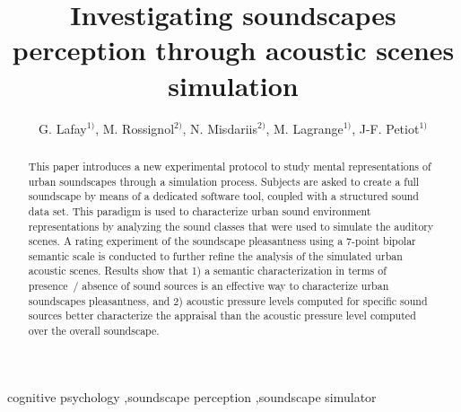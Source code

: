 \documentclass[12pt]{elsarticle}
\begin{document}
\begin{frontmatter}


    \author{G. Lafay$^{1)}$, M. Rossignol$^{2)}$, N. Misdariis$^{2)}$, M. Lagrange$^{1)}$, J-F. Petiot$^{1)}$}

    \address{$^{1)}$ Laboratoire des Sciences du Numérique de Nantes-CNRS-\'Ecole Centrale de Nantes, Nantes, France.\\
    \hspace*{8pt}mathieu.lagrange@cnrs.fr\\
    $^{2)}$ STMS Ircam-CNRS-SU Institut de Recherche et Coordination Acoustique/Musique, Paris, France}


    \title{Investigating soundscapes perception through acoustic scenes simulation}

  \begin{abstract}
    This paper introduces a new experimental protocol to study mental representations of urban soundscapes through a simulation process. Subjects are asked to create a full soundscape by means of a dedicated software tool, coupled with a structured sound data set. This paradigm is used to characterize urban sound environment representations by analyzing the sound classes that were used to simulate the auditory scenes. A rating experiment of the soundscape pleasantness using a 7-point bipolar semantic scale is conducted to further refine the analysis of the simulated urban acoustic scenes. Results show that 1) a semantic characterization in terms of presence~/ absence of sound sources is an effective way to characterize urban soundscapes pleasantness, and 2) acoustic pressure levels computed for specific sound sources better characterize the appraisal than the acoustic pressure level computed over the overall soundscape.
  \end{abstract}

  \begin{keyword}
 cognitive psychology \sep soundscape perception \sep soundscape simulator


  \end{keyword}

\end{frontmatter}


\end{document}
